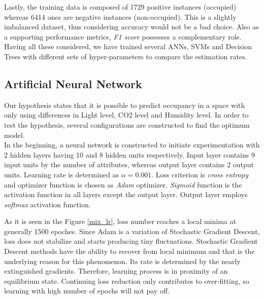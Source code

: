 \documentclass[conference]{IEEEtran}
\begin{document}
Lastly, the training data is composed of 1729 positive instances (occupied) whereas 6414 ones are negative instances (non-occupied). This is a slightly imbalanced dataset, thus considering accuracy would not be a bad choice. Also as a supporting performance metrics, \textit{F1 score} possesses a complementary role. Having all these considered, we have trained several ANNs, SVMs and Decision Trees with different sets of hyper-parameters to compare the estimation rates.

\vspace{-0.1cm}

\subsection{Artificial Neural Network}

Our hypothesis states that it is possible to predict occupancy in a space with only using differences in Light level, CO2 level and Humidity level. In order to test the hypothesis, several configurations are constructed to find the optimum model.\\

In the beginning, a neural network is constructed to initiate experimentation with 2 hidden layers having 10 and 8 hidden units respectively. Input layer contains  9 input units by the number of attributes, whereas output layer contains 2 output units. Learning rate is determined as $\alpha = 0.001$. Loss criterion is \textit{cross entropy} and optimizer function is chosen as \textit{Adam} optimizer\cite{Adam}. \textit{Sigmoid} function is the activation function in all layers except the output layer. Output layer employs \textit{softmax} activation function.

As it is seen in the Figure \ref{mix_lr}, loss number reaches a local minima at generally 1500 epoches. Since Adam is a variation of Stochastic Gradient Descent, loss does not stabilize and starts producing tiny fluctuations. Stochastic Gradient Descent methods have the ability to recover from local minimum and that is the underlying reason for this phenomenon. Its rate is determined by the nearly extinguished gradients. Therefore, learning process is in proximity of an equilibrium state. Continuing loss reduction only contributes to over-fitting, so learning with high number of epochs will not pay off.
\end{document}
